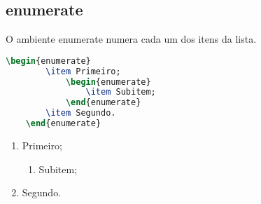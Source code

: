 \subsection{\textsf{enumerate}}
O ambiente \textsf{enumerate} numera cada um dos itens da lista. \\
\begin{minipage}[t]{0.47\linewidth} \vspace{-8pt}
    \begin{lstlisting}[language=TeX]
    \begin{enumerate}
        \item Primeiro;
            \begin{enumerate}
                \item Subitem;
            \end{enumerate}
        \item Segundo.
    \end{enumerate}
    \end{lstlisting}
\end{minipage} \hfill
\begin{minipage}[t]{0.47\linewidth} \vspace{0pt}
    \begin{enumerate}
        \item Primeiro;
            \begin{enumerate}
                \item Subitem;
            \end{enumerate}
        \item Segundo.
    \end{enumerate}
\end{minipage}

